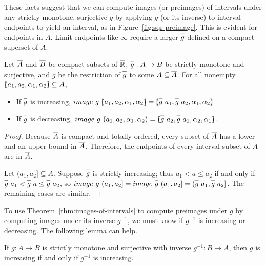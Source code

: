 These facts suggest that we can compute images (or preimages) of intervals under any strictly monotone, surjective $g$ by applying $g$ (or its inverse) to interval endpoints to yield an interval, as in Figure~\ref{fig:sqr-preimage}.
This is evident for endpoints in $A$.
Limit endpoints like $\infty$ require a larger $\cl{g}$ defined on a compact superset of $A$.

\begin{theorem}
\label{thm:images-of-intervals}
Let $\cl{A}$ and $\cl{B}$ be compact subsets of $\cl{\Re}$, $\cl{g} : \cl{A} \to \cl{B}$ be strictly monotone and surjective, and $g$ be the restriction of $\cl{g}$ to some $A \subseteq \cl{A}$.
For all nonempty $[\mspace{-4.5mu}(a_1,a_2,\alpha_1,\alpha_2)\mspace{-4.5mu}] \subseteq A$,
\begin{itemize}
	\item If $\cl{g}$ is increasing, $image~g~\ivl{a_1,a_2,\alpha_1,\alpha_2} = \ivl{\cl{g}~a_1, \cl{g}~a_2,\alpha_1,\alpha_2}$.
	\item If $\cl{g}$ is decreasing, $image~g~\ivl{a_1,a_2,\alpha_1,\alpha_2} = \ivl{\cl{g}~a_2, \cl{g}~a_1,\alpha_2,\alpha_1}$.
\end{itemize}
\end{theorem}
\begin{proof}
Because $\cl{A}$ is compact and totally ordered, every subset of $\cl{A}$ has a lower and an upper bound in $\cl{A}$.
Therefore, the endpoints of every interval subset of $A$ are in $\cl{A}$.

Let $(a_1,a_2] \subseteq A$.
Suppose $\cl{g}$ is strictly increasing; thus $a_1 < a \leq a_2$ if and only if $\cl{g}~a_1 < \cl{g}~a \leq \cl{g}~a_2$, so $image~g~(a_1,a_2] = image~\cl{g}~(a_1,a_2] = (\cl{g}~a_1,\cl{g}~a_2]$.
The remaining cases are similar.
\end{proof}

To use Theorem~\ref{thm:images-of-intervals} to compute preimages under $g$ by computing images under its inverse $g^{-1}$, we must know if $g^{-1}$ is increasing or decreasing.
The following lemma can help.

\begin{lemma}
\label{lem:inverse-direction}
If $g : A \to B$ is strictly monotone and surjective with inverse $g^{-1} : B \to A$, then $g$ is increasing if and only if $g^{-1}$ is increasing.
\end{lemma}

